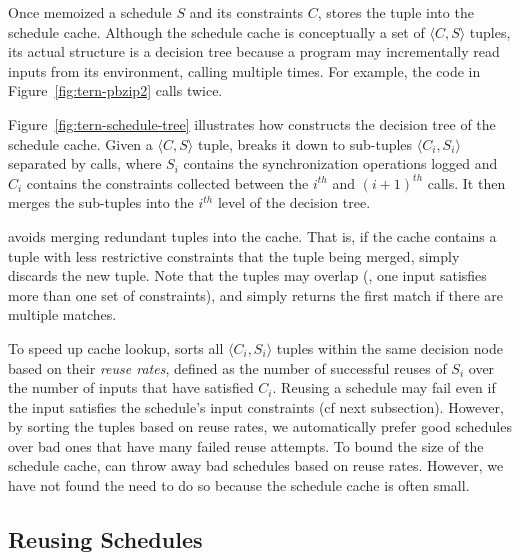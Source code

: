 Once \tern memoized a schedule $S$ and its constraints $C$, \tern stores the
tuple into the schedule cache.  Although the schedule cache is
conceptually a set of $\langle C, S \rangle$ tuples, its actual structure
is a decision tree because a program may incrementally read inputs from
its environment, calling  multiple times.  For example, the
code in Figure~\ref{fig:tern-pbzip2} calls  twice.

Figure~\ref{fig:tern-schedule-tree} illustrates how \tern constructs the
decision tree of the schedule cache.  Given a $\langle C, S \rangle$
tuple, \tern breaks it down to sub-tuples $\langle C_i, S_i \rangle$
separated by  calls, where $S_i$ contains the
synchronization operations logged and $C_i$ contains the constraints
collected between the $i^{th}$ and $(i+1)^{th}$  calls.  It
then merges the sub-tuples into the $i^{th}$ level of the decision tree.

\tern avoids merging redundant tuples into the cache.  That is, if the
cache contains a tuple with less restrictive constraints that the tuple
being merged, \tern simply discards the new tuple.  Note that the tuples
may overlap (\ie, one input satisfies more than one set of constraints),
and \tern simply returns the first match if there are multiple matches.

To speed up cache lookup, \tern sorts all $\langle C_i, S_i \rangle$ tuples
within the same decision node based on their \emph{reuse rates}, defined
as the number of successful reuses of $S_i$ over the number of inputs that
have satisfied $C_i$.  Reusing a schedule may fail even if the input
satisfies the schedule's input constraints (cf next subsection).  However,
by sorting the tuples based on reuse rates, we automatically prefer good
schedules over bad ones that have many failed reuse attempts.  To bound
the size of the schedule cache, \tern can throw away bad schedules based on
reuse rates.  However, we have not found the need to do so because
the schedule cache is often small.



\subsection{Reusing Schedules} \label{sec:tern-reuse-schedule}

